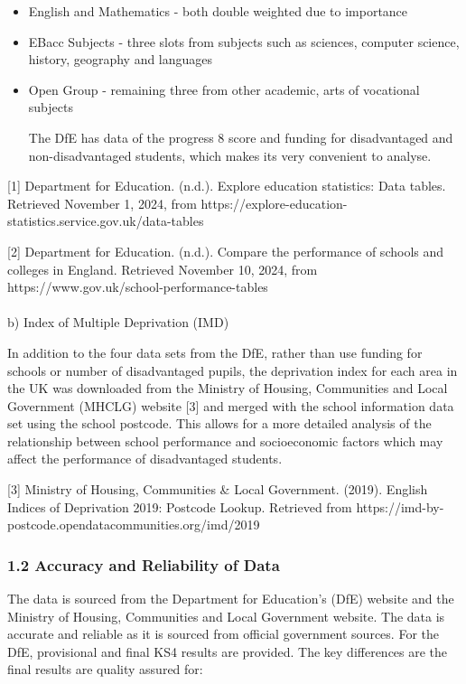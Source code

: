 \documentclass[
  letterpaper,
  DIV=11,
  numbers=noendperiod]{scrartcl}
\makeatletter
\let\oldparagraph\paragraph
\renewcommand{\paragraph}{
    \@ifstar
      \xxxParagraphStar
      \xxxParagraphNoStar
  }
\newcommand{\xxxParagraphStar}[1]{\oldparagraph*{#1}\mbox{}}
\newcommand{\xxxParagraphNoStar}[1]{\oldparagraph{#1}\mbox{}}
\makeatother
\begin{document}
\begin{itemize}
\item
  English and Mathematics - both double weighted due to importance
\item
  EBacc Subjects - three slots from subjects such as sciences, computer
  science, history, geography and languages
\item
  Open Group - remaining three from other academic, arts of vocational
  subjects

  The DfE has data of the progress 8 score and funding for disadvantaged
  and non-disadvantaged students, which makes its very convenient to
  analyse.
\end{itemize}

{[}1{]} Department for Education. (n.d.). Explore education statistics:
Data tables. Retrieved November 1, 2024, from
https://explore-education-statistics.service.gov.uk/data-tables

{[}2{]} Department for Education. (n.d.). Compare the performance of
schools and colleges in England. Retrieved November 10, 2024, from
https://www.gov.uk/school-performance-tables

\paragraph{b) Index of Multiple Deprivation
(IMD)}\label{b-index-of-multiple-deprivation-imd}

In addition to the four data sets from the DfE, rather than use funding
for schools or number of disadvantaged pupils, the deprivation index for
each area in the UK was downloaded from the Ministry of Housing,
Communities and Local Government (MHCLG) website {[}3{]} and merged with
the school information data set using the school postcode. This allows
for a more detailed analysis of the relationship between school
performance and socioeconomic factors which may affect the performance
of disadvantaged students.

{[}3{]} Ministry of Housing, Communities \& Local Government. (2019).
English Indices of Deprivation 2019: Postcode Lookup. Retrieved from
https://imd-by-postcode.opendatacommunities.org/imd/2019

\subsubsection{1.2 Accuracy and Reliability of
Data}\label{accuracy-and-reliability-of-data}

The data is sourced from the Department for Education's (DfE) website
and the Ministry of Housing, Communities and Local Government website.
The data is accurate and reliable as it is sourced from official
government sources. For the DfE, provisional and final KS4 results are
provided. The key differences are the final results are quality assured
for:
\end{document}
